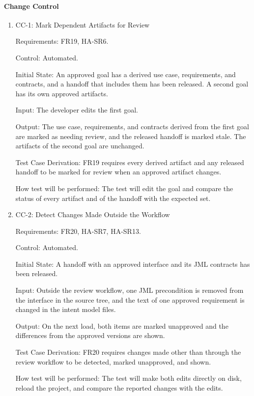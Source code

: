 \documentclass[12pt, titlepage]{article}
\begin{document}
\paragraph{Change Control}

\begin{enumerate}

\item{CC-1: Mark Dependent Artifacts for Review\\}

Requirements: FR19, HA-SR6.

Control: Automated.

Initial State: An approved goal has a derived use case, requirements, and
contracts, and a handoff that includes them has been released. A second goal
has its own approved artifacts.

Input: The developer edits the first goal.

Output: The use case, requirements, and contracts derived from the first goal
are marked as needing review, and the released handoff is marked stale. The
artifacts of the second goal are unchanged.

Test Case Derivation: FR19 requires every derived artifact and any released
handoff to be marked for review when an approved artifact changes.

How test will be performed: The test will edit the goal and compare the
status of every artifact and of the handoff with the expected set.

\item{CC-2: Detect Changes Made Outside the Workflow\\}

Requirements: FR20, HA-SR7, HA-SR13.

Control: Automated.

Initial State: A handoff with an approved interface and its JML contracts has
been released.

Input: Outside the review workflow, one JML precondition is removed from the
interface in the source tree, and the text of one approved requirement is
changed in the intent model files.

Output: On the next load, both items are marked unapproved and the
differences from the approved versions are shown.

Test Case Derivation: FR20 requires changes made other than through the
review workflow to be detected, marked unapproved, and shown.

How test will be performed: The test will make both edits directly on disk,
reload the project, and compare the reported changes with the edits.

\end{enumerate}
\end{document}
